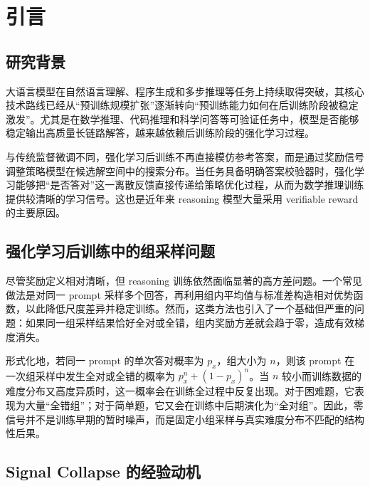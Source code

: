 \chapter{引言}\label{chap:introduction}

\section{研究背景}

大语言模型在自然语言理解、程序生成和多步推理等任务上持续取得突破，其核心技术路线已经从“预训练规模扩张”逐渐转向“预训练能力如何在后训练阶段被稳定激发”\citep{vaswani2017attention,brown2020languagemodels,touvron2023llama,bai2023qwen,zhao2023surveylargelanguagemodels}。尤其是在数学推理、代码推理和科学问答等可验证任务中，模型是否能够稳定输出高质量长链路解答，越来越依赖后训练阶段的强化学习过程\citep{ouyang2022training,dai2023safe,lee2023rlaif,chaudhari2024rlhf,deepseekai2025deepseekr1}。

与传统监督微调不同，强化学习后训练不再直接模仿参考答案，而是通过奖励信号调整策略模型在候选解空间中的搜索分布。当任务具备明确答案校验器时，强化学习能够把“是否答对”这一离散反馈直接传递给策略优化过程，从而为数学推理训练提供较清晰的学习信号\citep{cobbe2021training,hendrycks2021math,lightman2023verify,lewkowycz2022solving,ying2024internlmmath}。这也是近年来 reasoning 模型大量采用 verifiable reward 的主要原因。

\section{强化学习后训练中的组采样问题}

尽管奖励定义相对清晰，但 reasoning 训练依然面临显著的高方差问题。一个常见做法是对同一 prompt 采样多个回答，再利用组内平均值与标准差构造相对优势函数，以此降低尺度差异并稳定训练\citep{deepseekai2025deepseekr1,zhang2025realsafer1,xiong2025reinforceada}。然而，这类方法也引入了一个基础但严重的问题：如果同一组采样结果恰好全对或全错，组内奖励方差就会趋于零，造成有效梯度消失。

形式化地，若同一 prompt 的单次答对概率为 $p_x$，组大小为 $n$，则该 prompt 在一次组采样中发生全对或全错的概率为 $p_x^n+(1-p_x)^n$。当 $n$ 较小而训练数据的难度分布又高度异质时，这一概率会在训练全过程中反复出现。对于困难题，它表现为大量“全错组”；对于简单题，它又会在训练中后期演化为“全对组”。因此，零信号并不是训练早期的暂时噪声，而是固定小组采样与真实难度分布不匹配的结构性后果。

\section{Signal Collapse 的经验动机}

